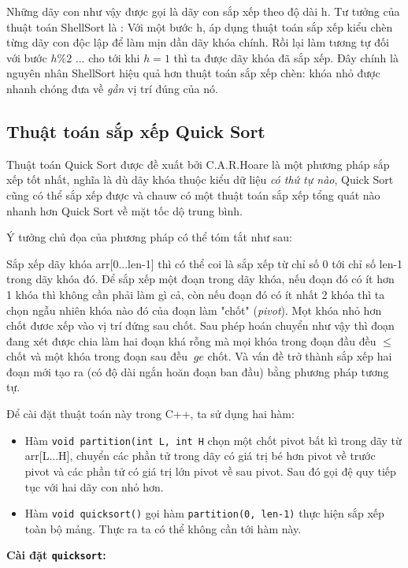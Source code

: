 \documentclass[a4paper]{article}
\newcommand{\mnt}[1]{\inputminted[frame=single, linenos=true, tabsize=4]{c++}{#1}}
\begin{document}
Những dãy con như vậy được gọi là dãy con sắp xếp theo độ dài h. Tư tưởng của thuật toán ShellSort là : Với một bước h, áp dụng thuật toán sắp xếp kiểu chèn từng dãy con độc lập để làm mịn dần dãy khóa chính. Rồi lại làm tương tự đối với bước $h \% 2$ ... cho tới khi $h=1$ thì ta được dãy khóa đã sắp xếp.
Đây chính là nguyên nhân ShellSort hiệu quả hơn thuật toán sắp xếp chèn: khóa nhỏ được nhanh chóng đưa về \emph{gần} vị trí đúng của nó.

\subsection{Thuật toán sắp xếp Quick Sort}

Thuật toán Quick Sort được đề xuất bởi C.A.R.Hoare là một phương pháp sắp xếp tốt nhất, nghĩa là dù dãy khóa thuộc kiểu dữ liệu \emph{có thứ tự nào}, Quick Sort cũng có thể sắp xếp được và chauw có một thuật toán sắp xếp tổng quát nào nhanh hơn Quick Sort về mặt tốc dộ trung bình. 

Ý tưởng chủ đọa của phương pháp có thể tóm tắt như sau:

Sắp xếp dãy khóa arr[0...len-1] thì có thể coi là sắp xếp từ chỉ số 0 tới chỉ số len-1 trong dãy khóa đó. Để sắp xếp một đoạn trong dãy khóa, nếu đoạn đó có ít hơn 1 khóa thì không cần phải làm gì cả, còn nếu đoạn đó có ít nhất 2 khóa thì ta chọn ngẫu nhiên khóa nào đó của đoạn làm "chốt" (\emph{pivot}). Mọt khóa nhỏ hơn chốt đươc xếp vào vị trí đứng sau chốt. Sau phép hoán chuyển như vậy thì đoạn đang xét được chia làm hai đoạn khá rỗng mà mọi khóa trong đoạn đầu đều $ \le $ chốt và một khóa trong đoạn sau đều $\ ge $ chốt. Và vấn đề trở thành sắp xếp hai đoạn mới tạo ra (có độ dài ngắn hoăn đoạn ban đầu) bằng phương pháp tương tự.

Để cài đặt thuật toán này trong C++, ta sử dụng hai hàm:

\begin{itemize} 
\item Hàm \texttt{void partition(int L, int H} chọn một chốt pivot bất kì trong dãy từ arr[L...H], chuyển các phần tử trong dãy có giá trị bé hơn pivot về trước pivot và các phần tử có giá trị lớn pivot về sau pivot. Sau đó gọi đệ quy tiếp tục với hai dãy con nhỏ hơn.
\item Hàm \texttt{void quicksort()} gọi hàm \texttt{partition(0, len-1)} thực hiện sắp xếp toàn bộ mảng. Thực ra ta có thể không cần tới hàm này.
\end{itemize}

\textbf{Cài đặt \texttt{quicksort}: }
\mnt{src/quicksort.cpp}
\end{document}

